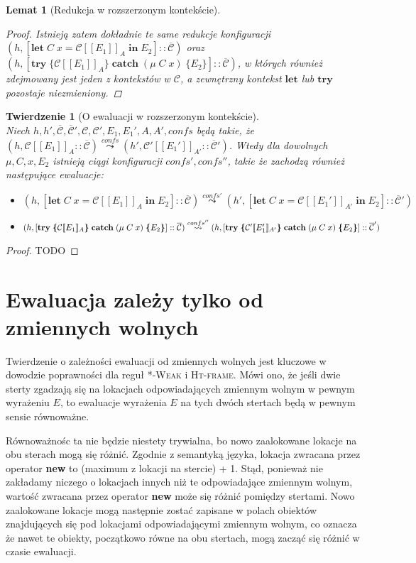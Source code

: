 \documentclass[]{pracamgr}
\renewcommand \| {\hspace{0.75em} | \hspace{0.75em} }
\renewcommand \[ {[\![}
\renewcommand \] {]\!]}
\newcommand \eval [1] {\overset{#1}{\leadsto}}
\newtheorem{theorem}{Twierdzenie}
\newtheorem{lemma}{Lemat}
\theoremstyle{definition}
\newcommand{\mmod}{\mu\xspace}
\newcommand{\jlet}{\mathbf{let}\xspace}
\newcommand{\jin}{\mathbf{in}\xspace}
\newcommand{\jtry}{\mathbf{try}\xspace}
\newcommand{\jcatch}{\mathbf{catch}\xspace}
\newcommand{\letin}[4]{\jlet\; #1\; #2 = #3\; \jin\; #4\xspace}
\newcommand{\tcatch}[4]{\jtry\; \boldsymbol{\{}#1\boldsymbol{\}}\; \jcatch\; (#2\; #3)\; \boldsymbol{\{}#4\boldsymbol{\}}\xspace}
\newcommand{\ctxt}{\mathcal{C}\xspace}
\newcommand{\ctxts}{\overline{\ctxt}}
\begin{document}
\begin{lemma}[Redukcja w rozszerzonym kontekście]{\ }
\begin{proof}
Istnieją zatem dokładnie te same redukcje konfiguracji
$(h, [ \letin{C}{x}{\ctxt \[ E_1 \]_A}{E_2}] :: \ctxts)$ oraz
$(h, [ \tcatch{\ctxt \[ E_1 \]_A}{\mmod\; C}{x}{E_2}] :: \ctxts)$,
w których również zdejmowany jest
jeden z kontekstów w $\ctxt$, a zewnętrzny kontekst $\jlet$ lub $\jtry$ pozostaje niezmieniony.
\end{proof}
\end{lemma}

\begin{theorem}[O ewaluacji w rozszerzonym kontekście]{\ } \\
\label{th:eval_ext_ctx}
Niech $h, h', \ctxts, \ctxts', \ctxt, \ctxt', E_1, E_1', A, A', confs$ będą takie, że
$(h, \ctxt \[ E_1 \]_A :: \ctxts) \eval{confs} (h', \ctxt' \[ E_1' \]_{A'} :: \ctxts')$.
Wtedy dla dowolnych $\mmod, C, x, E_2$ istnieją ciągi konfiguracji $confs', confs''$, takie że
zachodzą również następujące ewaluacje:
\begin{itemize}
 \item $(h, [ \letin{C}{x}{\ctxt \[ E_1 \]_A}{E_2}] :: \ctxts) \eval{confs'}
        (h', [ \letin{C}{x}{\ctxt \[ E_1'\]_{A'}}{E_2}] :: \ctxts')$
 \item $(h, [ \tcatch{\ctxt \[ E_1 \]_A}{\mmod\; C}{x}{E_2}] :: \ctxts) \eval{confs''} \\
        (h, [ \tcatch{\ctxt' \[ E_1' \]_{A'}}{\mmod\; C}{x}{E_2}] :: \ctxts')$
\end{itemize}
\end{theorem}
\begin{proof}
TODO
\end{proof}

\section{Ewaluacja zależy tylko od zmiennych wolnych}
Twierdzenie o zależności ewaluacji od zmiennych wolnych jest kluczowe w dowodzie poprawności dla
reguł \textsc{*-Weak} i \textsc{Ht-frame}.
Mówi ono, że jeśli dwie sterty zgadzają się na lokacjach odpowiadających zmiennym wolnym w pewnym wyrażeniu $E$,
to ewaluacje wyrażenia $E$ na tych dwóch stertach będą w pewnym sensie równoważne.

Równoważnośc ta nie będzie niestety trywialna, bo nowo zaalokowane lokacje na obu sterach mogą się różnić.
Zgodnie z semantyką języka, lokacja zwracana przez operator \textbf{new} to (maximum z lokacji na stercie) + 1.
Stąd, ponieważ nie zakładamy niczego o lokacjach innych niż te odpowiadające zmiennym wolnym,
wartość zwracana przez operator \textbf{new} może się różnić pomiędzy stertami.
Nowo zaalokowane lokacje mogą następnie zostać zapisane w polach obiektów znajdujących się pod lokacjami
odpowiadającymi zmiennym wolnym, co oznacza że nawet te obiekty, początkowo równe na obu stertach,
mogą zacząć się różnić w czasie ewaluacji.
\end{document}
